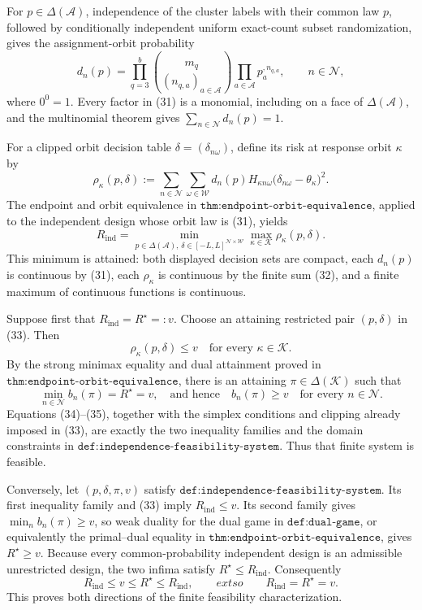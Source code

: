 For \(p\in\Delta(\mathcal A)\), independence of the cluster labels with their common law \(p\), followed by conditionally independent uniform exact-count subset randomization, gives the assignment-orbit probability
\[
d_n(p)=\prod_{q=3}^{b}
 \binom{m_q}{(n_{q,a})_{a\in\mathcal A}}
 \prod_{a\in\mathcal A}p_a^{,n_{q,a}},
\qquad n\in\mathcal N,                                                     \tag{31}
\]
where \(0^0=1\).  Every factor in (31) is a monomial, including on a face of \(\Delta(\mathcal A)\), and the multinomial theorem gives \(\sum_{n\in\mathcal N}d_n(p)=1\).

For a clipped orbit decision table \(\delta=(\delta_{n\omega})\), define its risk at response orbit \(\kappa\) by
\[
 \rho_\kappa(p,\delta)
 :=\sum_{n\in\mathcal N}\sum_{\omega\in\mathcal W}
 d_n(p)H_{\kappa n\omega}
 \bigl(\delta_{n\omega}-\theta_\kappa\bigr)^2.                            \tag{32}
\]
The endpoint and orbit equivalence in \(\texttt{thm:endpoint-orbit-equivalence}\), applied to the independent design whose orbit law is (31), yields
\[
 R_{\mathrm{ind}}
 =\min_{p\in\Delta(\mathcal A),\,
              \delta\in[-L,L]^{\mathcal N\times\mathcal W}}
       \max_{\kappa\in\mathcal K}\rho_\kappa(p,\delta).                 \tag{33}
\]
This minimum is attained: both displayed decision sets are compact, each \(d_n(p)\) is continuous by (31), each \(\rho_\kappa\) is continuous by the finite sum (32), and a finite maximum of continuous functions is continuous.

Suppose first that \(R_{\mathrm{ind}}=R^\star=:v\).  Choose an attaining restricted pair \((p,\delta)\) in (33).  Then
\[
 \rho_\kappa(p,\delta)\le v
 \quad\text{for every }\kappa\in\mathcal K.                               \tag{34}
\]
By the strong minimax equality and dual attainment proved in \(\texttt{thm:endpoint-orbit-equivalence}\), there is an attaining \(\pi\in\Delta(\mathcal K)\) such that
\[
 \min_{n\in\mathcal N}b_n(\pi)=R^\star=v,
 \quad\text{and hence}\quad
 b_n(\pi)\ge v\quad\text{for every }n\in\mathcal N.                     \tag{35}
\]
Equations (34)--(35), together with the simplex conditions and clipping already imposed in (33), are exactly the two inequality families and the domain constraints in \(\texttt{def:independence-feasibility-system}\).  Thus that finite system is feasible.

Conversely, let \((p,\delta,\pi,v)\) satisfy \(\texttt{def:independence-feasibility-system}\).  Its first inequality family and (33) imply \(R_{\mathrm{ind}}\le v\).  Its second family gives \(\min_n b_n(\pi)\ge v\), so weak duality for the dual game in \(\texttt{def:dual-game}\), or equivalently the primal--dual equality in \(\texttt{thm:endpoint-orbit-equivalence}\), gives \(R^\star\ge v\).  Because every common-probability independent design is an admissible unrestricted design, the two infima satisfy \(R^\star\le R_{\mathrm{ind}}\).  Consequently
\[
 R_{\mathrm{ind}}\le v\le R^\star\le R_{\mathrm{ind}},
 \qquad	ext{so}\qquad
 R_{\mathrm{ind}}=R^\star=v.                                               \tag{36}
\]
This proves both directions of the finite feasibility characterization.

